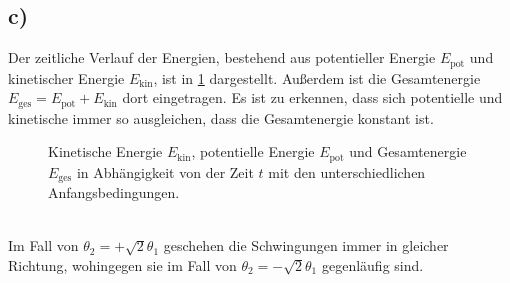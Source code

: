 \subsection*{c)}
Der zeitliche Verlauf der Energien, bestehend aus potentieller Energie $E_\text{pot}$ und kinetischer Energie $E_\text{kin}$, ist in \cref{fig:Energie} dargestellt.
Außerdem ist die Gesamtenergie $E_\text{ges}=E_\text{pot}+E_\text{kin}$ dort eingetragen.
Es ist zu erkennen, dass sich potentielle und kinetische immer so ausgleichen, dass die Gesamtenergie konstant ist.
\begin{figure}[h!]
	\caption{Kinetische Energie $E_\text{kin}$, potentielle Energie $E_\text{pot}$ und Gesamtenergie $E_\text{ges}$ in Abhängigkeit von der Zeit $t$ mit den unterschiedlichen Anfangsbedingungen.\label{fig:Energie}}
\end{figure}\\
Im Fall von $\theta_2=+\sqrt{2}\theta_1$ geschehen die Schwingungen immer in gleicher Richtung, wohingegen sie im Fall von $\theta_2=-\sqrt{2}\theta_1$ gegenläufig sind.
